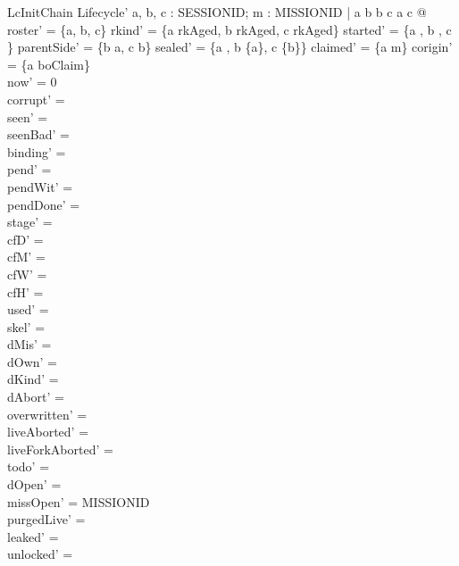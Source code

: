 \documentclass[a4paper,10pt,fleqn]{article}
\begin{document}
\begin{schema}{LcInitChain}
Lifecycle'
\where
\exists a, b, c : SESSIONID; m : MISSIONID | a \neq b \land b \neq c \land a \neq c @ roster' = \{a, b, c\} \land rkind' = \{a \mapsto rkAged, b \mapsto rkAged, c \mapsto rkAged\} \land started' = \{a , b , c \} \land parentSide' = \{b \mapsto a, c \mapsto b\} \land sealed' = \{a \mapsto \emptyset, b \mapsto \{a\}, c \mapsto \{b\}\} \land claimed' = \{a \mapsto m\} \land corigin' = \{a \mapsto boClaim\} \\
now' = 0 \\
corrupt' = \emptyset \\
seen' = \emptyset \\
seenBad' = \emptyset \\
binding' = \emptyset \\
pend' = \emptyset \\
pendWit' = \emptyset \\
pendDone' = \emptyset \\
stage' = \emptyset \\
cfD' = \emptyset \\
cfM' = \emptyset \\
cfW' = \emptyset \\
cfH' = \emptyset \\
used' = \emptyset \\
skel' = \emptyset \\
dMis' = \emptyset \\
dOwn' = \emptyset \\
dKind' = \emptyset \\
dAbort' = \emptyset \\
overwritten' = \emptyset \\
liveAborted' = \emptyset \\
liveForkAborted' = \emptyset \\
todo' = \emptyset \\
dOpen' = \emptyset \\
missOpen' = MISSIONID \\
purgedLive' = \emptyset \\
leaked' = \emptyset \\
unlocked' = \emptyset
\end{schema}
\end{document}
